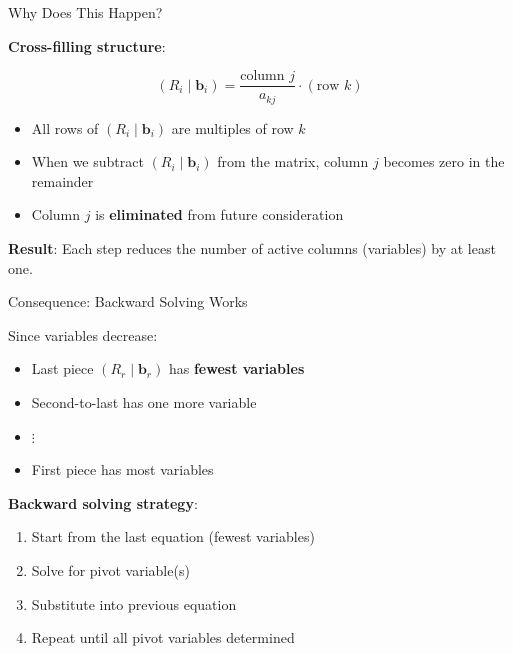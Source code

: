 \documentclass[10pt]{beamer}
\theoremstyle{definition}
\newcommand{\x}[1]{\alert{\textbf{#1}}}
\begin{document}
\begin{frame}{Why Does This Happen?}

\x{Cross-filling structure}:

$$(R_i \mid \mathbf{b}_i) = \frac{\text{column } j}{a_{kj}} \cdot (\text{row } k)$$

\vspace{1em}

\begin{itemize}
\item All rows of $(R_i \mid \mathbf{b}_i)$ are multiples of row $k$
\item When we subtract $(R_i \mid \mathbf{b}_i)$ from the matrix, column $j$ becomes zero in the remainder
\item Column $j$ is \x{eliminated} from future consideration
\end{itemize}

\vspace{1em}

\x{Result}: Each step reduces the number of active columns (variables) by at least one.

\end{frame}

\begin{frame}{Consequence: Backward Solving Works}

Since variables decrease:

\vspace{1em}

\begin{itemize}
\item Last piece $(R_r \mid \mathbf{b}_r)$ has \x{fewest variables}
\item Second-to-last has one more variable
\item $\vdots$
\item First piece has most variables
\end{itemize}

\vspace{1em}

\x{Backward solving strategy}:
\begin{enumerate}
\item Start from the last equation (fewest variables)
\item Solve for pivot variable(s)
\item Substitute into previous equation
\item Repeat until all pivot variables determined
\end{enumerate}

\end{frame}
\end{document}
